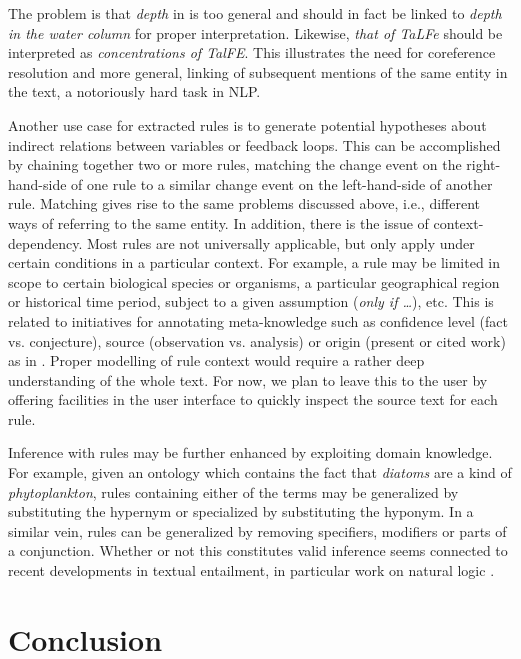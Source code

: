 \documentclass[10pt, a4paper]{article}
\begin{document}
The problem is that \emph{depth} in \Last[b] is too general and should in fact be linked to \emph{depth in the water column} for proper interpretation. 
Likewise, \emph{that of TaLFe} should be interpreted as \emph{concentrations of TalFE}.
This illustrates the need for coreference resolution and more general, linking of subsequent mentions of the same entity in the text, a notoriously hard task in NLP. 

Another use case for extracted rules is to generate potential hypotheses about indirect relations between variables or feedback loops.
This can be accomplished by chaining together two or more rules, matching the change event on the right-hand-side of one rule to a similar change event on the left-hand-side of another rule.
Matching gives rise to the same problems discussed above, i.e., different ways of referring to the same entity.
In addition, there is the issue of context-dependency.
Most rules are not universally applicable, but only apply under certain conditions in a particular context.
For example, a rule may be limited in scope to certain biological species or organisms, a particular geographical region or historical time period, subject to a given assumption (\emph{only if \ldots}), etc.
This is related to initiatives for annotating meta-knowledge such as confidence level (fact vs. conjecture), source (observation vs. analysis) or origin (present or cited work) as in  \cite{Thompson2011Enriching}.  
Proper modelling of rule context would require a rather deep understanding of the whole text. 
For now, we plan to leave this to the user by offering facilities in the user interface to quickly inspect the source text for each rule.

Inference with rules may be further enhanced by exploiting domain knowledge.
For example, given an ontology which contains the fact that \emph{diatoms} are a kind of \emph{phytoplankton}, rules containing either of the terms may be generalized by substituting the hypernym or specialized by substituting the hyponym.
In a similar vein, rules can be generalized by removing specifiers, modifiers or parts of a conjunction.
Whether or not this constitutes valid inference seems connected to recent developments in textual entailment, in particular work on natural logic \cite{MacCartney2008Modeling}.
    

\section{Conclusion}
\label{sec:conclusion}
\end{document}
